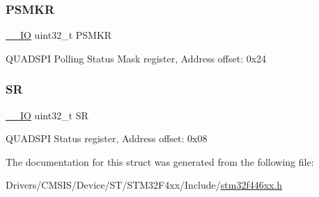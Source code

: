 \subsubsection{\texorpdfstring{P\+S\+M\+KR}{PSMKR}}
{\footnotesize\ttfamily \mbox{\hyperlink{core__sc300_8h_aec43007d9998a0a0e01faede4133d6be}{\+\_\+\+\_\+\+IO}} uint32\+\_\+t P\+S\+M\+KR}

Q\+U\+A\+D\+S\+PI Polling Status Mask register, Address offset\+: 0x24 \mbox{\label{struct_q_u_a_d_s_p_i___type_def_af6aca2bbd40c0fb6df7c3aebe224a360}} 
\subsubsection{\texorpdfstring{SR}{SR}}
{\footnotesize\ttfamily \mbox{\hyperlink{core__sc300_8h_aec43007d9998a0a0e01faede4133d6be}{\+\_\+\+\_\+\+IO}} uint32\+\_\+t SR}

Q\+U\+A\+D\+S\+PI Status register, Address offset\+: 0x08 

The documentation for this struct was generated from the following file\+:\begin{DoxyCompactItemize}
\item 
Drivers/\+C\+M\+S\+I\+S/\+Device/\+S\+T/\+S\+T\+M32\+F4xx/\+Include/\mbox{\hyperlink{stm32f446xx_8h}{stm32f446xx.\+h}}\end{DoxyCompactItemize}
